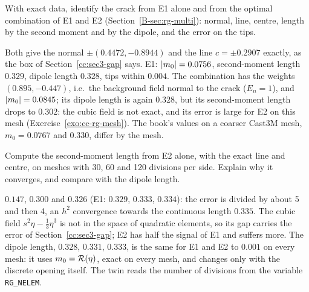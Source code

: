 \label{exo:cc-rg-steps}
%
With exact data, identify the crack from E1 alone and from the optimal
combination of E1 and E2 (Section~\ref{B-sec:rg-multi}): normal, line, centre,
length by the second moment and by the dipole, and the error on the tips.
\begin{solution}
Both give the normal $\pm(0.4472,-0.8944)$ and the line $c=\pm0.2907$ exactly,
as the box of Section~\ref{cc:sec3-gap} says. E1: $\lvert m_0\rvert=0.0756$,
second-moment length $0.329$, dipole length $0.328$, tips within $0.004$. The
combination has the weights $(0.895,-0.447)$, i.e.\ the background field
normal to the crack ($E_n=1$), and $\lvert m_0\rvert=0.0845$; its dipole length is
again $0.328$, but its second-moment length drops to $0.302$: the cubic field is
not exact, and its error is large for E2 on this mesh
(Exercise~\ref{exo:cc-rg-mesh}). The book's values on a coarser Cast3M mesh,
$m_0=0.0767$ and $0.330$, differ by the mesh.

\end{solution}

\label{exo:cc-rg-mesh}
%
Compute the second-moment length from E2 alone, with the exact line and centre,
on meshes with 30, 60 and 120 divisions per side. Explain why it converges,
and compare with the dipole length.
\begin{solution}
$0.147$, $0.300$ and $0.326$ (E1: $0.329$, $0.333$, $0.334$): the error is
divided by about 5 and then 4, an $h^2$ convergence towards the continuous
length $0.335$. The cubic field $s^2\eta-\tfrac13\eta^3$ is not in the space of
quadratic elements, so its gap carries the error of
Section~\ref{cc:sec3-gap}; E2 has half the signal of E1 and suffers more. The
dipole length, $0.328$, $0.331$, $0.333$, is the same for E1 and E2 to
$0.001$ on every mesh: it uses $m_0=\mathcal{R}(\eta)$, exact on every mesh, and changes
only with the discrete opening itself. The twin reads the number of divisions from the
variable \texttt{RG\_NELEM}.

\end{solution}

